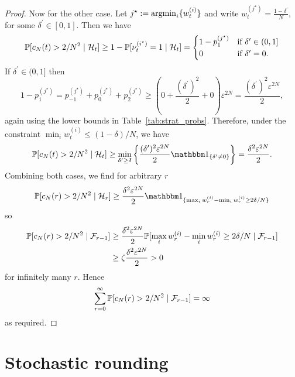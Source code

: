 \begin{proof}
Now for the other case. Let $j^\star := \operatorname*{argmin}_i \{ w_t^{(i)} \}$ and write
$w_t^{(j^\star)} = \frac{1-\delta^\prime}{N}$, for some $\delta^\prime \in [0,1]$.
Then we have
\begin{equation*}
\mathbb{P}[ c_N(t) > 2/N^2 \mid \mathcal{H}_t ]
\geq 1- \mathbb{P}[ \nu_t^{(i^\star)} =1 \mid \mathcal{H}_t ]
=\begin{cases}
    1- p_1^{(j^\star)} & \text{if } \delta^\prime \in (0,1] \\
    0 & \text{if } \delta^\prime =0 .
\end{cases}
\end{equation*}
If $\delta^\prime \in (0,1]$ then
\begin{equation*}
1- p_1^{(j^\star)} = p_{-1}^{(j^\star)} + p_0^{(j^\star)} + p_2^{(j^\star)}
\geq \left( 0 + \frac{ (\delta^\prime)^2 }{2} + 0 \right) \varepsilon^{2N}
= \frac{ (\delta^\prime)^2 \varepsilon^{2N} }{2} ,
\end{equation*}
again using the lower bounds in Table~\ref{tab:strat_probs}.
Therefore, under the constraint $\min_i w_t^{(i)} \leq (1-\delta)/N$, we have
\begin{equation*}
\Prob[ c_N(t) > 2/N^2 \mid \mathcal{H}_t ]
\geq \min_{\delta^\prime \geq \delta} 
        \left\{ \frac{ (\delta^\prime)^2 \varepsilon^{2N} }{2} 
        \I{\delta^\prime \neq 0} \right\}
= \frac{ \delta^2 \varepsilon^{2N} }{2} .
\end{equation*}
Combining both cases, we find for arbitrary $r$
\begin{equation*}
\Prob[ c_N(r) > 2/N^2 \mid \mathcal{H}_r ] 
\geq  \frac{ \delta^2 \varepsilon^{2N} }{2}
        \I{ \max_i w_r^{(i)} - \min_i w_r^{(i)} \geq 2\delta/N }
\end{equation*}
so
\begin{align*}
\mathbb{P}[ c_N(r) > 2/N^2 \mid \mathcal{F}_{r-1} ] 
&\geq  \frac{ \delta^2 \varepsilon^{2N} }{2}
        \mathbb{P}[ \max_i w_r^{(i)} - \min_i w_r^{(i)} \geq 2\delta/N 
        \mid \mathcal{F}_{r-1} ] \\
&\geq \zeta \frac{ \delta^2 \varepsilon^{2N} }{2}
> 0
\end{align*}
for infinitely many $r$.
Hence
\begin{equation*}
\sum_{r=0}^\infty \mathbb{P}[ c_N(r) > 2/N^2  \mid \mathcal{F}_{r-1} ] = \infty
\end{equation*}
as required.
\end{proof}



\section{Stochastic rounding \seb{$\checkmark$} }

